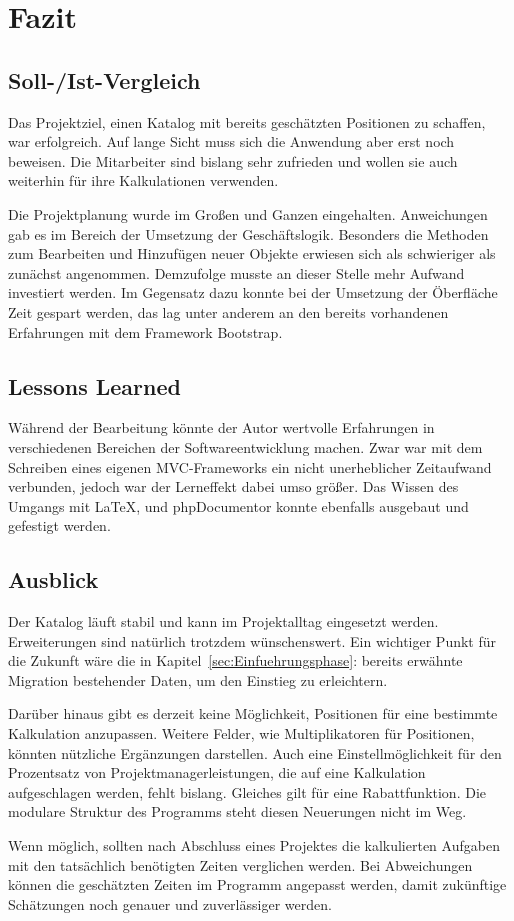 \section{Fazit} 
\label{sec:Fazit}

\subsection{Soll-/Ist-Vergleich}
\label{sec:SollIstVergleich}
Das Projektziel, einen Katalog mit bereits geschätzten Positionen zu schaffen,
war erfolgreich. Auf lange Sicht muss sich die Anwendung aber erst noch
beweisen. Die Mitarbeiter sind bislang sehr zufrieden und wollen sie
auch weiterhin für ihre Kalkulationen verwenden.

Die Projektplanung wurde im Großen und Ganzen eingehalten. Anweichungen gab es
im Bereich der Umsetzung der Geschäftslogik. Besonders die Methoden zum
Bearbeiten und Hinzufügen neuer Objekte erwiesen sich als schwieriger als
zunächst angenommen. Demzufolge musste an dieser Stelle mehr Aufwand investiert
werden. Im Gegensatz dazu konnte bei der Umsetzung der Öberfläche Zeit gespart
werden, das lag unter anderem an den bereits vorhandenen Erfahrungen mit dem
Framework Bootstrap.


\subsection{Lessons Learned}
\label{sec:LessonsLearned}
Während der Bearbeitung könnte der Autor wertvolle Erfahrungen in
verschiedenen Bereichen der Softwareentwicklung machen. Zwar war mit dem
Schreiben eines eigenen \acs{MVC}-Frameworks ein nicht unerheblicher Zeitaufwand
verbunden, jedoch war der Lerneffekt dabei umso größer. Das Wissen \bzgl des
Umgangs mit \LaTeX, und phpDocumentor konnte ebenfalls ausgebaut und gefestigt
werden.


\subsection{Ausblick}
\label{sec:Ausblick}
Der Katalog läuft stabil und kann im Projektalltag eingesetzt werden.
Erweiterungen sind natürlich trotzdem wünschenswert. Ein wichtiger Punkt für die
Zukunft wäre die in Kapitel~\ref{sec:Einfuehrungsphase}:
 bereits erwähnte Migration bestehender Daten, um
den Einstieg zu erleichtern.

Darüber hinaus gibt es derzeit keine Möglichkeit, Positionen für eine
bestimmte Kalkulation anzupassen. Weitere Felder, wie \bspw
Multiplikatoren für Positionen, könnten nützliche Ergänzungen darstellen.
Auch eine Einstellmöglichkeit für den Prozentsatz von Projektmanagerleistungen,
die auf eine Kalkulation aufgeschlagen werden, fehlt bislang. Gleiches gilt für
eine Rabattfunktion. Die modulare Struktur des Programms steht diesen Neuerungen
nicht im Weg.

Wenn möglich, sollten nach Abschluss eines Projektes die kalkulierten Aufgaben
mit den tatsächlich benötigten Zeiten verglichen werden. Bei Abweichungen können
die geschätzten Zeiten im Programm angepasst werden, damit zukünftige
Schätzungen noch genauer und zuverlässiger werden.
